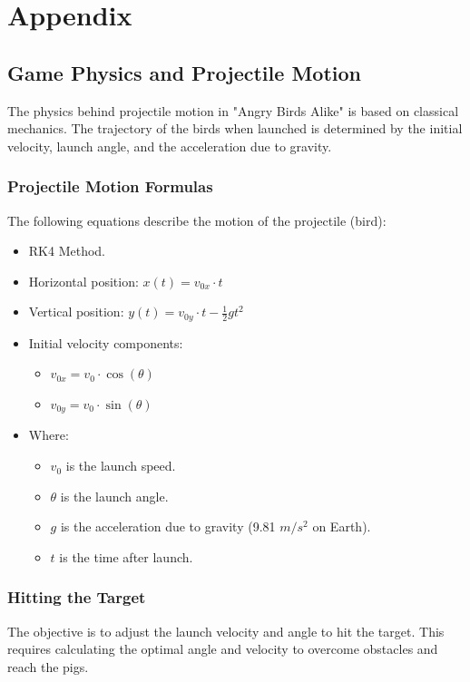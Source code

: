 \documentclass[12pt]{article}
\begin{document}
\appendix
\section{Appendix}

\subsection{Game Physics and Projectile Motion}

The physics behind projectile motion in "Angry Birds Alike" is based on classical mechanics. The trajectory of the birds when launched is determined by the initial velocity, launch angle, and the acceleration due to gravity.

\subsubsection*{Projectile Motion Formulas}

The following equations describe the motion of the projectile (bird):
\begin{itemize}
    \item RK4 Method.
    \item Horizontal position: \( x(t) = v_{0x} \cdot t \)
    \item Vertical position: \( y(t) = v_{0y} \cdot t - \frac{1}{2} g t^2 \)
    \item Initial velocity components:
    \begin{itemize}
        \item \( v_{0x} = v_0 \cdot \cos(\theta) \)
        \item \( v_{0y} = v_0 \cdot \sin(\theta) \)
    \end{itemize}
    \item Where:
    \begin{itemize}
        \item \( v_0 \) is the launch speed.
        \item \( \theta \) is the launch angle.
        \item \( g \) is the acceleration due to gravity (9.81 \( m/s^2 \) on Earth).
        \item \( t \) is the time after launch.
    \end{itemize}
\end{itemize}

\subsubsection*{Hitting the Target}
The objective is to adjust the launch velocity and angle to hit the target. This requires calculating the optimal angle and velocity to overcome obstacles and reach the pigs.
\end{document}
